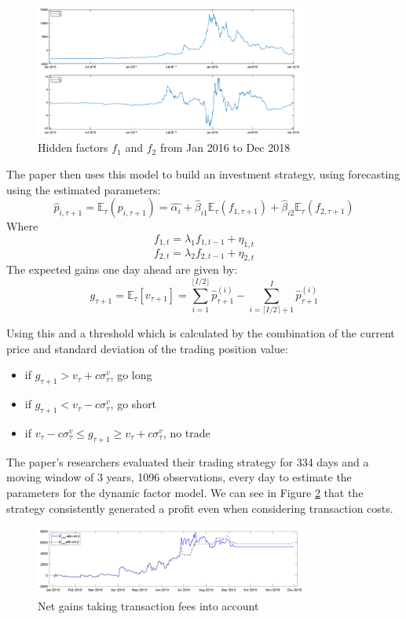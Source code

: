 \begin{figure}[h!]
    \centering
    \includegraphics[width=0.8\textwidth]{background/Images/hidden_factors.png}
    \caption{Hidden factors $f_1$ and $f_2$ from Jan 2016 to Dec 2018~\cite{Figa-TalamancaGianna2021Cdff}}
    \label{fig:hiddenfactors}
\end{figure}
\vspace{5mm}
\noindent The paper then uses this model to build an investment strategy, using forecasting using the estimated parameters:
$$\hat{p}_{i, \tau + 1} = \mathbb{E}_{\tau}(p_{i, \tau + 1}) = \hat{\alpha_i} + \hat{\beta}_{i 1} \mathbb{E}_{\tau}(f_{1, \tau + 1}) + \hat{\beta}_{i 2} \mathbb{E}_{\tau}(f_{2, \tau + 1}) $$
Where
$$f_{1, t} = \lambda_1 f_{1, t-1} + \eta_{1,t}$$
$$f_{2, t} = \lambda_2 f_{2, t-1} + \eta_{2,t}$$
The expected gains one day ahead are given by:
$$g_{\tau + 1} =  \mathbb{E}_{\tau}[v_{\tau + 1}] = \sum_{i=1}^{\lfloor I / 2 \rfloor} \hat{p}_{\tau + 1}^{(i)} - \sum_{i=\lceil I / 2 \rceil + 1}^{I} \hat{p}_{\tau + 1}^{(i)} $$

\noindent Using this and a threshold which is calculated by the combination of the current price and standard deviation of the trading position value:
\begin{itemize}
    \itemsep0em
    \item if $g_{\tau + 1} > v_{\tau} + c \sigma_{\tau}^v$, go long
    \item if $g_{\tau + 1} < v_{\tau} - c \sigma_{\tau}^v$, go short
    \item if $v_{\tau} - c \sigma_{\tau}^v \leq g_{\tau + 1} \geq v_{\tau} + c \sigma_{\tau}^v$, no trade
\end{itemize}

\noindent The paper's researchers evaluated their trading strategy for 334 days and a moving window of 3 years, 1096 observations, every day to estimate the parameters for the dynamic factor model. We can see in Figure \ref{fig:gains} that the strategy consistently generated a profit even when considering transaction costs.
\\[3mm]
\begin{figure}[htb!]
    \centering
    \includegraphics[width=0.8\textwidth]{background/Images/gains.png}
    \caption{Net gains taking transaction fees into account~\cite{Figa-TalamancaGianna2021Cdff}}
    \label{fig:gains}
\end{figure}

